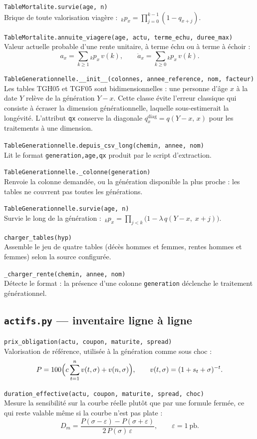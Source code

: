 \documentclass[10pt,a4paper]{article}
\newcommand{\fn}[2]{\par\smallskip\textcolor{bleufonce}{\texttt{#1}}\\ #2\par}
\begin{document}
\fn{TableMortalite.survie(age, n)}{Brique de toute valorisation viagère :
$\,_k p_x = \prod_{j=0}^{k-1}(1 - q_{x+j})$.}

\fn{TableMortalite.annuite\_viagere(age, actu, terme\_echu, duree\_max)}{Valeur actuelle probable
d'une rente unitaire, à terme échu ou à terme à échoir :
\[
a_x = \sum_{k\ge 1} {}_k p_x\, v(k), \qquad
\ddot a_x = \sum_{k\ge 0} {}_k p_x\, v(k).
\]}

\fn{TableGenerationnelle.\_\_init\_\_(colonnes, annee\_reference, nom, facteur)}{Les tables TGH05
et TGF05 sont bidimensionnelles : une personne d'âge $x$ à la date $Y$ relève de la génération
$Y - x$. Cette classe évite l'erreur classique qui consiste à écraser la dimension
générationnelle, laquelle sous-estimerait la longévité. L'attribut \texttt{qx} conserve la
diagonale $q_x^{\text{diag}} = q(Y-x,\,x)$ pour les traitements à une dimension.}

\fn{TableGenerationnelle.depuis\_csv\_long(chemin, annee, nom)}{Lit le format
\texttt{generation,age,qx} produit par le script d'extraction.}

\fn{TableGenerationnelle.\_colonne(generation)}{Renvoie la colonne demandée, ou la génération
disponible la plus proche : les tables ne couvrent pas toutes les générations.}

\fn{TableGenerationnelle.survie(age, n)}{Survie le long de la génération :
$\,_k p_x = \prod_{j<k}\bigl(1 - \lambda\, q(Y-x,\; x+j)\bigr)$.}

\fn{charger\_tables(hyp)}{Assemble le jeu de quatre tables (décès hommes et femmes, rentes
hommes et femmes) selon la source configurée.}

\fn{\_charger\_rente(chemin, annee, nom)}{Détecte le format : la présence d'une colonne
\texttt{generation} déclenche le traitement générationnel.}

\subsection{\texttt{actifs.py} — inventaire ligne à ligne}

\fn{prix\_obligation(actu, coupon, maturite, spread)}{Valorisation de référence, utilisée à la
génération comme sous choc :
\[
P = 100\Bigl(c\sum_{t=1}^{n} v(t,\sigma) + v(n,\sigma)\Bigr),
\qquad v(t,\sigma) = (1+s_t+\sigma)^{-t}.
\]}

\fn{duration\_effective(actu, coupon, maturite, spread, choc)}{Mesure la sensibilité sur la
courbe réelle plutôt que par une formule fermée, ce qui reste valable même si la courbe n'est pas
plate :
\[
D_m = \frac{P(\sigma - \varepsilon) - P(\sigma + \varepsilon)}{2\,P(\sigma)\,\varepsilon},
\qquad \varepsilon = 1~\text{pb}.
\]}
\end{document}
